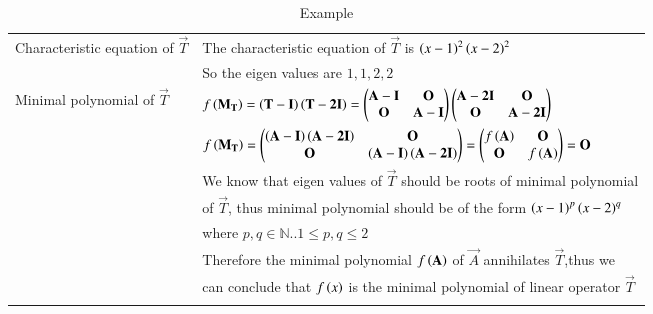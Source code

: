 \documentclass[journal,12pt]{IEEEtran}
\begin{document}
\begin{longtable}{|l|l|}
         \hline
        Characteristic equation of $\vec{T}$&The characteristic equation of $\vec{T}$ is $\left(x-1\right)^2\left(x-2\right)^2$\\
        & So the eigen values are $1,1,2,2$\\
        \hline
        Minimal polynomial of $\vec{T}$&$f\left(\mathbf{M_T}\right)=\left(\mathbf{T-I}\right)\left(\mathbf{T-2I}\right)=\begin{pmatrix}\mathbf{A-I}&\mathbf{O}\\\mathbf{O}&\mathbf{A-I}\end{pmatrix}\begin{pmatrix}\mathbf{A-2I}&\mathbf{O}\\\mathbf{O}&\mathbf{A-2I}\end{pmatrix}$\\
         &$f\left(\mathbf{M_T}\right)=\begin{pmatrix}\mathbf{\left(A-I\right)\left(A-2I\right)}&\mathbf{O}\\\mathbf{O}&\mathbf{\left(A-I\right)\left(A-2I\right)}\end{pmatrix}=\begin{pmatrix}f\left(\mathbf{A}\right)&\mathbf{O}\\\mathbf{O}&f\left(\mathbf{A}\right)\end{pmatrix}=\mathbf{O}$\\
        & We know that eigen values of $\vec{T}$ should be roots of minimal polynomial\\
        & of $\vec{T}$, thus minimal polynomial should be of the form $\left(x-1\right)^p\left(x-2\right)^q$\\
        & where $p,q \in \mathbb{N}.. 1\leq p,q\leq2$\\
        &Therefore the minimal polynomial $f\left(\mathbf{A}\right)$ of $\vec{A}$ annihilates $\vec{T}$,thus we \\
        & can conclude that $f\left({x}\right)$ is the minimal polynomial of linear operator $\vec{T}$\\
    \hline
    \caption{Example}
    \label{tab:construction}
\end{longtable}
\end{document}
